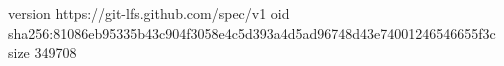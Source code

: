 version https://git-lfs.github.com/spec/v1
oid sha256:81086eb95335b43c904f3058e4c5d393a4d5ad96748d43e74001246546655f3c
size 349708
